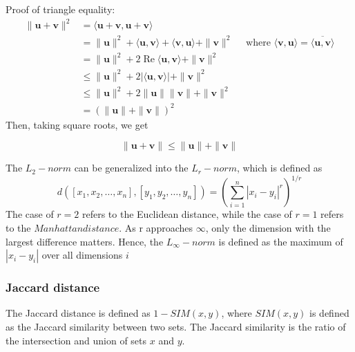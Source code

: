 Proof of triangle equality: 
\begin{equation}
\begin{aligned}
\|\mathbf{u}+\mathbf{v}\|^{2} &=\langle\mathbf{u}+\mathbf{v}, \mathbf{u}+\mathbf{v}\rangle \\
&=\|\mathbf{u}\|^{2}+\langle\mathbf{u}, \mathbf{v}\rangle+\langle\mathbf{v}, \mathbf{u}\rangle+\|\mathbf{v}\|^{2} \quad \text { where }\langle\mathbf{v}, \mathbf{u}\rangle=\overline{\langle\mathbf{u}, \mathbf{v}\rangle} \\
&=\|\mathbf{u}\|^{2}+2 \operatorname{Re}\langle\mathbf{u}, \mathbf{v}\rangle+\|\mathbf{v}\|^{2} \\
& \leq\|\mathbf{u}\|^{2}+2|\langle\mathbf{u}, \mathbf{v}\rangle|+\|\mathbf{v}\|^{2} \\
& \leq\|\mathbf{u}\|^{2}+2\|\mathbf{u}\|\|\mathbf{v}\|+\|\mathbf{v}\|^{2} \\
&=(\|\mathbf{u}\|+\|\mathbf{v}\|)^{2}
\end{aligned}
\end{equation}
Then, taking square roots, we get 

\begin{equation}
\|\mathbf{u}+\mathbf{v}\| \leq\|\mathbf{u}\|+\|\mathbf{v}\|
\end{equation}

The $L_{2}-norm$ can be generalized into the $L_{r}-norm$, which is defined as 
\begin{equation}
d\left(\left[x_{1}, x_{2}, \ldots, x_{n}\right],\left[y_{1}, y_{2}, \ldots, y_{n}\right]\right)=\left(\sum_{i=1}^{n}\left|x_{i}-y_{i}\right|^{r}\right)^{1 / r}
\end{equation}
The case of $r=2$ refers to the Euclidean distance, while the case of $r=1$ refers to the $Manhattan distance$.
As r approaches $\infty$, only the dimension with the largest difference matters. Hence, the $L_{\infty}-norm$ is defined as the maximum of $|x_i-y_i|$ over all dimensions $i$

\subsubsection{Jaccard distance}
The Jaccard distance is defined as $1 - SIM(x,y)$, where $SIM(x,y)$ is defined as the Jaccard similarity between two sets. The Jaccard similarity is the ratio of the intersection and union of sets $x$ and $y$. 